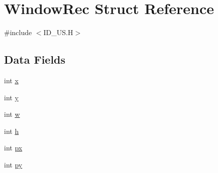 \hypertarget{structWindowRec}{
\section{WindowRec Struct Reference}
\label{structWindowRec}
}


{\ttfamily \#include $<$ID\_\-US.H$>$}

\subsection*{Data Fields}
\begin{DoxyCompactItemize}
\item 
int \hyperlink{structWindowRec_a8ddc970ca8233167841d9639d08201bf}{x}
\item 
int \hyperlink{structWindowRec_ab92158805a04a027ed057ee13452e1d7}{y}
\item 
int \hyperlink{structWindowRec_af51253796a178bef8aaf64f4fc6d6742}{w}
\item 
int \hyperlink{structWindowRec_a3aaa5408ac1d2e1196b83ef72312f0ac}{h}
\item 
int \hyperlink{structWindowRec_a24cd10a3d46de5ce680eab7c5d236a7b}{px}
\item 
int \hyperlink{structWindowRec_a99d1e632f2891aeb9555520ef5a257a8}{py}
\end{DoxyCompactItemize}


